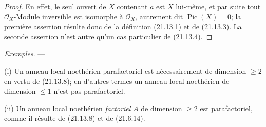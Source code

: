 \begin{proof}
En effet, le seul ouvert de $X$ contenant $a$ est $X$ lui-même, et par suite tout
$\mathcal O_X$-Module inversible est isomorphe à $\mathcal O_X$, autrement dit
$\operatorname{Pic}(X)=0$; la première assertion résulte donc de la définition
(21.13.1) et de (21.13.3). La seconde assertion n'est autre qu'un cas particulier de
(21.13.4).
\end{proof}

\begin{env}[21.13.9]
\label{IV.21.13.9}
\emph{Exemples}. ---

(i) Un anneau local noethérien parafactoriel est nécessairement de dimension
$\geq2$ en vertu de (21.13.8); en d'autres termes un anneau local noethérien de
dimension $\leq1$ n'est pas parafactoriel.

(ii) Un anneau local noethérien \emph{factoriel} $A$ de dimension $\geq2$ est
parafactoriel, comme il résulte de (21.13.8) et de (21.6.14).


\end{env}
